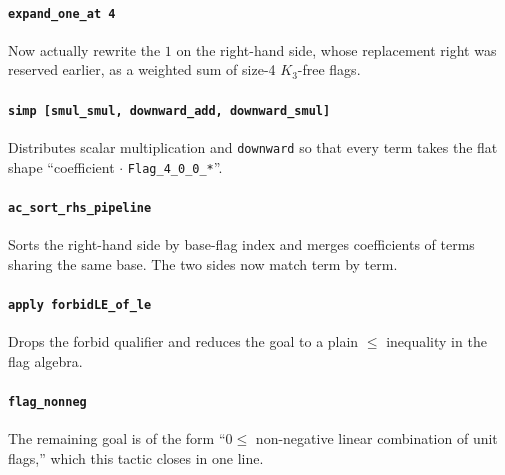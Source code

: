 \documentclass[11pt]{article}
\begin{document}
\paragraph{\texttt{expand\_one\_at 4}}
Now actually rewrite the $1$ on the right-hand side, whose replacement
right was reserved earlier, as a weighted sum of size-4 $K_3$-free flags.

\paragraph{\texttt{simp [smul\_smul, downward\_add, downward\_smul]}}
Distributes scalar multiplication and \texttt{downward} so that every term
takes the flat shape ``coefficient $\cdot$ \texttt{Flag\_4\_0\_0\_*}''.

\paragraph{\texttt{ac\_sort\_rhs\_pipeline}}
Sorts the right-hand side by base-flag index and merges coefficients of
terms sharing the same base. The two sides now match term by term.

\paragraph{\texttt{apply forbidLE\_of\_le}}
Drops the forbid qualifier and reduces the goal to a plain $\le$ inequality
in the flag algebra.

\paragraph{\texttt{flag\_nonneg}}
The remaining goal is of the form ``$0 \le$ non-negative linear combination
of unit flags,'' which this tactic closes in one line.
\end{document}
